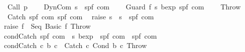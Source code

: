 \begin{isabellebody}
\ \ {\isacharbar}\ Call\ {\isachardoublequoteopen}{\isacharprime}p{\isachardoublequoteclose}\ \isanewline
\ \ {\isacharbar}\ DynCom\ {\isachardoublequoteopen}{\isacharprime}s\ {\isasymRightarrow}\ {\isacharparenleft}{\isacharprime}s{\isacharcomma}{\isacharprime}p{\isacharcomma}{\isacharprime}f{\isacharparenright}\ com{\isachardoublequoteclose}\ \isanewline
\ \ {\isacharbar}\ Guard\ {\isachardoublequoteopen}{\isacharprime}f{\isachardoublequoteclose}\ {\isachardoublequoteopen}{\isacharprime}s\ bexp{\isachardoublequoteclose}\ {\isachardoublequoteopen}{\isacharparenleft}{\isacharprime}s{\isacharcomma}{\isacharprime}p{\isacharcomma}{\isacharprime}f{\isacharparenright}\ com{\isachardoublequoteclose}\ \isanewline
\ \ {\isacharbar}\ Throw\isanewline
\ \ {\isacharbar}\ Catch\ {\isachardoublequoteopen}{\isacharparenleft}{\isacharprime}s{\isacharcomma}{\isacharprime}p{\isacharcomma}{\isacharprime}f{\isacharparenright}\ com{\isachardoublequoteclose}\ {\isachardoublequoteopen}{\isacharparenleft}{\isacharprime}s{\isacharcomma}{\isacharprime}p{\isacharcomma}{\isacharprime}f{\isacharparenright}\ com{\isachardoublequoteclose}%
\isamarkuptrue%
\isamarkupfalse%
\isanewline
\ \ raise{\isacharcolon}{\isacharcolon}\ {\isachardoublequoteopen}{\isacharparenleft}{\isacharprime}s\ {\isasymRightarrow}\ {\isacharprime}s{\isacharparenright}\ {\isasymRightarrow}\ {\isacharparenleft}{\isacharprime}s{\isacharcomma}{\isacharprime}p{\isacharcomma}{\isacharprime}f{\isacharparenright}\ com{\isachardoublequoteclose}\ \isanewline
\ \ {\isachardoublequoteopen}raise\ f\ {\isacharequal}\ Seq\ {\isacharparenleft}Basic\ f{\isacharparenright}\ Throw{\isachardoublequoteclose}\isanewline
\isanewline
{}\isamarkupfalse%
\isanewline
\ \ condCatch{\isacharcolon}{\isacharcolon}\ {\isachardoublequoteopen}{\isacharparenleft}{\isacharprime}s{\isacharcomma}{\isacharprime}p{\isacharcomma}{\isacharprime}f{\isacharparenright}\ com\ {\isasymRightarrow}\ {\isacharprime}s\ bexp\ {\isasymRightarrow}\ {\isacharparenleft}{\isacharprime}s{\isacharcomma}{\isacharprime}p{\isacharcomma}{\isacharprime}f{\isacharparenright}\ com\ {\isasymRightarrow}\ {\isacharparenleft}{\isacharprime}s{\isacharcomma}{\isacharprime}p{\isacharcomma}{\isacharprime}f{\isacharparenright}\ com{\isachardoublequoteclose}\ \isanewline
\ \ {\isachardoublequoteopen}condCatch\ c\ b\ c\ {\isacharequal}\ Catch\ c\ {\isacharparenleft}Cond\ b\ c\ Throw{\isacharparenright}{\isachardoublequoteclose}\isanewline

\end{isabellebody}
